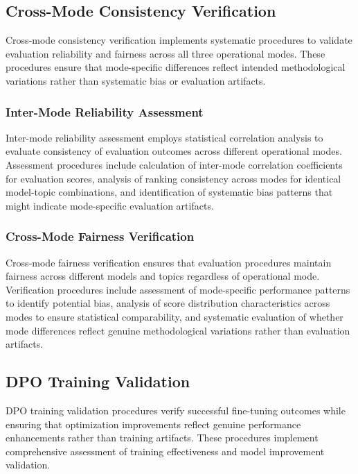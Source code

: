 \subsection{Cross-Mode Consistency Verification}

Cross-mode consistency verification implements systematic procedures to validate evaluation reliability and fairness across all three operational modes. These procedures ensure that mode-specific differences reflect intended methodological variations rather than systematic bias or evaluation artifacts.

\subsubsection{Inter-Mode Reliability Assessment}

Inter-mode reliability assessment employs statistical correlation analysis to evaluate consistency of evaluation outcomes across different operational modes. Assessment procedures include calculation of inter-mode correlation coefficients for evaluation scores, analysis of ranking consistency across modes for identical model-topic combinations, and identification of systematic bias patterns that might indicate mode-specific evaluation artifacts.

\subsubsection{Cross-Mode Fairness Verification}

Cross-mode fairness verification ensures that evaluation procedures maintain fairness across different models and topics regardless of operational mode. Verification procedures include assessment of mode-specific performance patterns to identify potential bias, analysis of score distribution characteristics across modes to ensure statistical comparability, and systematic evaluation of whether mode differences reflect genuine methodological variations rather than evaluation artifacts.

\subsection{DPO Training Validation}

DPO training validation procedures verify successful fine-tuning outcomes while ensuring that optimization improvements reflect genuine performance enhancements rather than training artifacts. These procedures implement comprehensive assessment of training effectiveness and model improvement validation.

